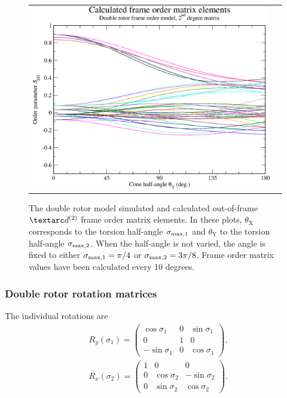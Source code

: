 \begin{figure}
\begin{tabular}{@{}cc@{}}
    \includegraphics[width=.5\textwidth]{images/frame_order_matrix/Sijkl_double_rotor_out_of_frame_theta_y_calc.eps} \\
  \end{tabular}
  \caption[Double rotor simulated and calculated out-of-frame Daeg$^{(2)}$ elements.]{
    The double rotor model simulated and calculated out-of-frame $\FOtwo$ frame order matrix elements.
    In these plots, $\theta_\textrm{X}$ corresponds to the torsion half-angle $\sigma_{\textrm{max,1}}$ and $\theta_\textrm{Y}$ to the torsion half-angle $\sigma_{\textrm{max,2}}$.
    When the half-angle is not varied, the angle is fixed to either $\sigma_{\textrm{max,1}} = \pi/4$ or $\sigma_{\textrm{max,2}} = 3\pi/8$.
    Frame order matrix values have been calculated every 10 degrees.
  }
  \label{fig: simulated and calculated out-of-frame 2nd degree double rotor frame order}
\end{figure}


\subsubsection{Double rotor rotation matrices}

The individual rotations are
\begin{subequations}
\begin{align}
    &R_y(\sigma_1) =
        \begin{pmatrix}
             \cos\sigma_1 & 0 & \sin\sigma_1 \\
             0 &            1 & 0 \\
            -\sin\sigma_1 & 0 & \cos\sigma_1
        \end{pmatrix}, \\
    &R_x(\sigma_2) =
        \begin{pmatrix}
            1 & 0            &  0 \\
            0 & \cos\sigma_2 & -\sin\sigma_2 \\
            0 & \sin\sigma_2 &  \cos\sigma_2
        \end{pmatrix}.
\end{align}
\end{subequations}


